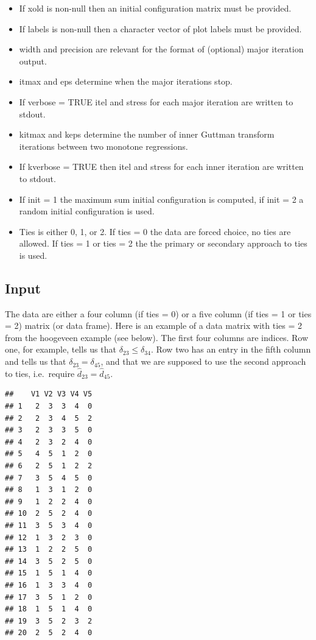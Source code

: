 \documentclass[
  12pt,
]{article}
\providecommand{\tightlist}{%
  \setlength{\itemsep}{0pt}\setlength{\parskip}{0pt}}
\begin{document}
\begin{itemize}
\tightlist
\item
  If xold is non-null then an initial configuration matrix must be provided.
\item
  If labels is non-null then a character vector of plot labels must be provided.
\item
  width and precision are relevant for the format of (optional) major iteration output.
\item
  itmax and eps determine when the major iterations stop.
\item
  If verbose = TRUE itel and stress for each major iteration are
  written to stdout.
\item
  kitmax and keps determine the number of inner Guttman transform iterations
  between two monotone regressions.
\item
  If kverbose = TRUE then itel and stress for each inner iteration are written to stdout.
\item
  If init = 1 the maximum sum initial configuration is computed, if init = 2 a random initial configuration is used.
\item
  Ties is either 0, 1, or 2. If ties = 0 the data are forced choice, no ties
  are allowed. If ties = 1 or ties = 2 the the primary or secondary approach
  to ties is used.
\end{itemize}

\subsection{Input}\label{input}

The data are either a four column (if ties = 0) or a five column (if ties = 1
or ties = 2) matrix (or data frame). Here is an example of a data matrix
with ties = 2 from the hoogeveen example (see below). The first four columns are indices. Row one, for example,
tells us that \(\delta_{23}\leq\delta_{34}\). Row two has an entry in the
fifth column and tells us that \(\delta_{23}=\delta_{45}\), and that we
are supposed to use the second approach to ties, i.e.~require
\(\hat d_{23}=\hat d_{45}\).

\begin{verbatim}
##    V1 V2 V3 V4 V5
## 1   2  3  3  4  0
## 2   2  3  4  5  2
## 3   2  3  3  5  0
## 4   2  3  2  4  0
## 5   4  5  1  2  0
## 6   2  5  1  2  2
## 7   3  5  4  5  0
## 8   1  3  1  2  0
## 9   1  2  2  4  0
## 10  2  5  2  4  0
## 11  3  5  3  4  0
## 12  1  3  2  3  0
## 13  1  2  2  5  0
## 14  3  5  2  5  0
## 15  1  5  1  4  0
## 16  1  3  3  4  0
## 17  3  5  1  2  0
## 18  1  5  1  4  0
## 19  3  5  2  3  2
## 20  2  5  2  4  0
\end{verbatim}
\end{document}
